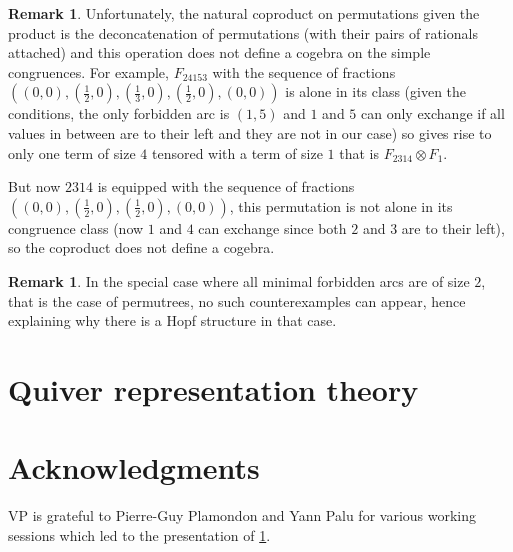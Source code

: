 \documentclass{amsart}
\theoremstyle{definition}
\newtheorem{remark}[theorem]{Remark}
\begin{document}
\begin{remark}
Unfortunately, the natural coproduct on permutations given the product is
the deconcatenation of permutations (with their pairs of rationals attached)
and this operation does not define a cogebra on the simple congruences.
For example, $F_{24153}$ with the sequence of fractions
$( (0,0), (\frac12,0), (\frac13,0), (\frac12,0), (0,0))$
is alone in its class (given the conditions, the only forbidden arc is $(1,5)$
and $1$ and $5$ can only exchange if all values in between are to their left
and they are not in our case) so gives rise to only one term of size $4$
tensored with a term of size $1$ that is
$F_{2314}\otimes F_{1}$.

But now $2314$ is equipped with the sequence of fractions
$( (0,0), (\frac12,0), (\frac12,0), (0,0) )$,
this permutation is not alone in its congruence class (now $1$ and $4$ can
exchange since both $2$ and $3$ are to their left), so the coproduct does
not define a cogebra.
\end{remark}

\begin{remark}
In the special case where all minimal forbidden arcs are of size $2$, that is
the case of permutrees, no such counterexamples can appear, hence explaining
why there is a Hopf structure in that case.
\end{remark}


\section{Quiver representation theory}
\label{subsec:representationTheory}


\section*{Acknowledgments}

VP is grateful to Pierre-Guy Plamondon and Yann Palu for various working sessions which led to the presentation of \cref{subsec:representationTheory}.




\label{sec:biblio}
\end{document}
